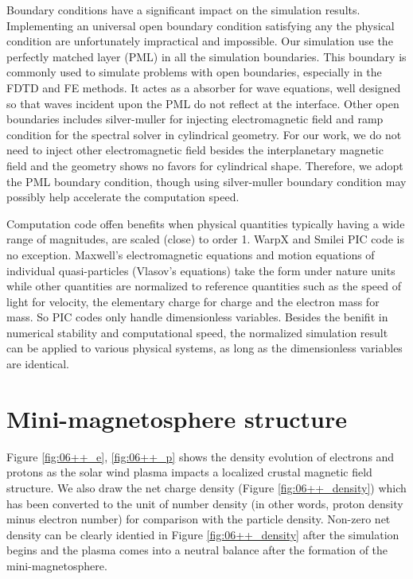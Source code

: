 Boundary conditions have a significant impact on the simulation results. Implementing an universal open boundary condition satisfying any the physical condition are unfortunately impractical and impossible. Our simulation use the perfectly matched layer (PML) in all the simulation boundaries. This boundary is commonly used to simulate problems with open boundaries, especially in the FDTD and FE methods. It actes as a absorber for wave equations, well designed so that waves incident upon the PML do not reflect at the interface. Other open boundaries includes silver-muller for injecting electromagnetic field and ramp condition for the spectral solver in cylindrical geometry. For our work, we do not need to inject other electromagnetic field besides the interplanetary magnetic field and the geometry shows no favors for cylindrical shape. Therefore, we adopt the PML boundary condition, though using silver-muller boundary condition may possibly help accelerate the computation speed.

Computation code offen benefits when physical quantities typically having a wide range of magnitudes, are scaled (close) to order 1. WarpX and Smilei PIC code is no exception. Maxwell's electromagnetic equations and motion equations of individual quasi-particles (Vlasov's equations) take the form under nature units while other quantities are normalized to reference quantities such as the speed of light for velocity, the elementary charge for charge and the electron mass for mass. So PIC codes only handle dimensionless variables. Besides the benifit in numerical stability and computational speed, the normalized simulation result can be applied to various physical systems, as long as the dimensionless variables are identical.


\section{Mini-magnetosphere structure}

Figure \ref{fig:06++_e}, \ref{fig:06++_p} shows the density evolution of electrons and protons as the solar wind plasma impacts a localized crustal magnetic field structure. We also draw  the net charge density (Figure \ref{fig:06++_density}) which has been converted to the unit of number density (in other words, proton density minus electron number) for comparison with the particle density. Non-zero net density can be clearly identied in Figure \ref{fig:06++_density} after the simulation begins and the plasma comes into a neutral balance after the formation of the mini-magnetosphere.


